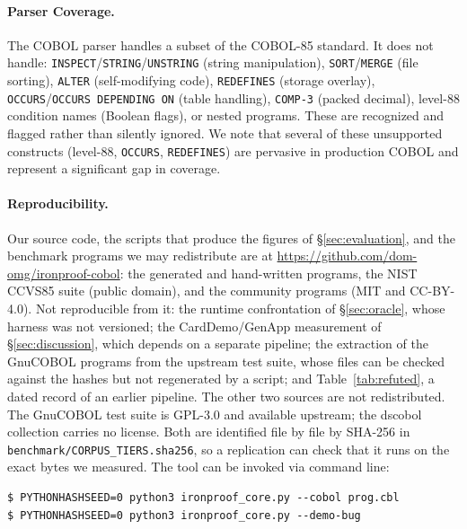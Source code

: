 \documentclass[sigconf,nonacm]{acmart}
\begin{document}
\paragraph{Parser Coverage.} The COBOL parser handles a subset of the COBOL-85 standard. It does not handle: \texttt{INSPECT}\slash\texttt{STRING}\slash\texttt{UNSTRING} (string manipulation), \texttt{SORT}\slash\texttt{MERGE} (file sorting), \texttt{ALTER} (self-modifying code), \texttt{REDEFINES} (storage overlay), \texttt{OCCURS}\slash\texttt{OCCURS DEPENDING ON} (table handling), \texttt{COMP-3} (packed decimal), level-88 condition names (Boolean flags), or nested programs. These are recognized and flagged rather than silently ignored. We note that several of these unsupported constructs (level-88, \texttt{OCCURS}, \texttt{REDEFINES}) are pervasive in production COBOL and represent a significant gap in coverage.

\paragraph{Reproducibility.} Our source code, the scripts that produce the figures of \S\ref{sec:evaluation}, and the benchmark programs we may redistribute are at \url{https://github.com/dom-omg/ironproof-cobol}: the generated and hand-written programs, the NIST CCVS85 suite (public domain), and the community programs (MIT and CC-BY-4.0). Not reproducible from it: the runtime confrontation of \S\ref{sec:oracle}, whose harness was not versioned; the CardDemo/GenApp measurement of \S\ref{sec:discussion}, which depends on a separate pipeline; the extraction of the GnuCOBOL programs from the upstream test suite, whose files can be checked against the hashes but not regenerated by a script; and Table~\ref{tab:refuted}, a dated record of an earlier pipeline. The other two sources are not redistributed. The GnuCOBOL test suite is GPL-3.0 and available upstream; the dscobol collection carries no license. Both are identified file by file by SHA-256 in \texttt{benchmark/CORPUS\_TIERS.sha256}, so a replication can check that it runs on the exact bytes we measured. The tool can be invoked via command line:

\begin{lstlisting}[basicstyle=\ttfamily\scriptsize,frame=single,float=tbp]
$ PYTHONHASHSEED=0 python3 ironproof_core.py --cobol prog.cbl
$ PYTHONHASHSEED=0 python3 ironproof_core.py --demo-bug
\end{lstlisting}

\end{document}
